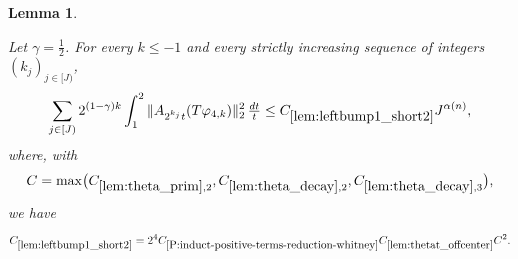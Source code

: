 \documentclass[12pt,reqno]{amsart}
\theoremstyle{plain}
\newtheorem{lemma}[theorem]{Lemma}
\numberwithin{equation}{section}
\theoremstyle{remark}
\newcommand{\uses}[1]{}
\newcommand{\usesdefs}[1]{}
\newcommand{\leanok}{}
\newcommand{\lean}[1]{}
\begin{document}
\begin{lemma}\label{lem:leftbump1_short2}\uses{Extension of sequences,A to Lambda,lem:theta_prim,lem:theta_decay,lem:thetat_offcenter,P:induct-positive-terms-reduction-whitney,lem:int_fct,lem:phi4_supp,lem:ft_deriv_mul}\usesdefs{A_def,bracket bump,normalized function tuples,auto:prism-form-definition,multiplicatively spaced monotone sequences,defn:window based bump functions}
\lean{Auto.leftBumpOneShortTwo}
\leanok
Let $\gamma=\frac12$. For every $k\le-1$ and every strictly increasing sequence of integers $(k_j)_{j\in[J)}$,
\begin{equation}\label{auto:left-bump-one-short-two-bound}
\sum_{j\in[J)}2^{(1-\gamma)k}\int_1^2
\|A_{2^{k_j}t}(T\varphi_{4,k})\|_2^2\,\tfrac{dt}{t}
\le C_{\ref{lem:leftbump1_short2}}J^{\alpha(n)},
\end{equation}
where, with
\begin{equation}\label{auto:left-bump-one-short-two-auxiliary-constant}
C=\max\bigl(C_{\ref{lem:theta_prim},2},C_{\ref{lem:theta_decay},2},C_{\ref{lem:theta_decay},3}\bigr),
\end{equation}
we have
\begin{equation}\label{auto:left-bump-one-short-two-constant-definition}
C_{\ref{lem:leftbump1_short2}}
=2^4C_{\ref{P:induct-positive-terms-reduction-whitney}}
C_{\ref{lem:thetat_offcenter}}C^2.
\end{equation}
\end{lemma}
\end{document}
